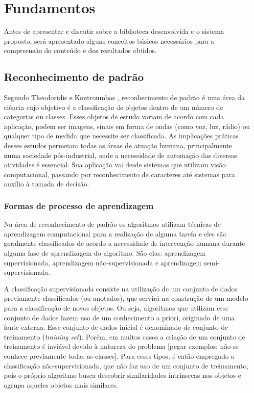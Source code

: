 \documentclass[a4paper,12pt]{article}
\begin{document}
\newpage
\section {Fundamentos}
\label {sec:fundamentos}
Antes de apresentar e discutir sobre a biblioteca desenvolvida e o sistema proposto, será apresentado alguns conceitos básicos necessários para a compreensão do conteúdo e dos resultados obtidos.

\subsection{Reconhecimento de padrão}
\label{sec:reconhecimento_padrao}

Segundo Theodoridis e Koutroumbas  \cite{Koutroumbas06}, reconhecimento de padrão é uma área da ciência cujo objetivo é a classificação de objetos dentro de um número de categorias ou classes. Esses objetos de estudo variam de acordo com cada aplicação, podem ser imagens, sinais em forma de ondas (como voz, luz, rádio) ou qualquer tipo de medida que necessite ser classificada. As implicações práticas desses estudos permeiam todas as áreas de atuação humana, principalmente numa sociedade pós-industrial, onde a necessidade de automação das diversas atividades é essencial.  Sua aplicação vai desde sistemas que utilizam visão computacional, passando por reconhecimento de caracteres até sistemas para auxílio à tomada de decisão.

\subsubsection{Formas de processo de aprendizagem}
\label{sec:formas_processo_aprendizagem}

Na área de reconhecimento de padrão os algoritmos utilizam técnicas de aprendizagem computacional para a realização de alguma tarefa e eles são geralmente classificados de acordo a necessidade de intervenção humana durante alguma fase de aprendizagem do algoritmo. São elas: aprendizagem supervisionada,  aprendizagem não-supervisionada e aprendizagem semi-supervisionada.

A classificação supervisionada consiste na utilização de um conjunto de dados previamente classificados (ou anotados), que servirá na construção de um modelo para a classificação de novos objetos. Ou seja, algoritmos que utilizam esse conjunto de dados fazem uso de um conhecimento a priori, originado de uma fonte externa. Esse conjunto de dados inicial é denominado de conjunto de treinamento (\textit{training set}). Porém, em muitos casos a criação de um conjunto de treinamento é inviável devido à natureza do problema [pegar exemplos: não se conhece previamente todas as classes]. Para esses tipos, é então empregado a classificação não-supervisionada, que não faz uso de um conjunto de treinamento, pois o próprio algoritmo busca descobrir similaridades intrínsecas nos objetos e agrupa aqueles objetos mais similares. \cite{Koutroumbas06, Jain99, Manning09}
\end{document}

